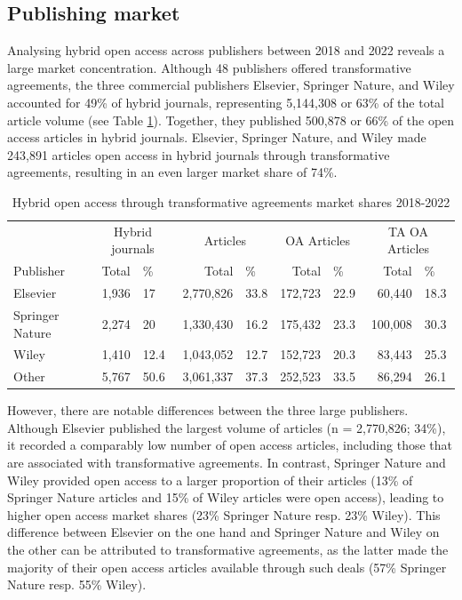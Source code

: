 \documentclass[a4paper,man,floatsintext,longtable,noextraspace,12pt]{apa6}
\begin{document}
\subsection{Publishing market}\label{publishing-market}

Analysing hybrid open access across publishers between 2018 and 2022
reveals a large market concentration. Although 48 publishers offered
transformative agreements, the three commercial publishers Elsevier,
Springer Nature, and Wiley accounted for 49\% of hybrid journals,
representing 5,144,308 or 63\% of the total article volume (see Table
\ref{tab:publisher_league_table}). Together, they published 500,878 or
66\% of the open access articles in hybrid journals. Elsevier, Springer
Nature, and Wiley made 243,891 articles open access in hybrid journals
through transformative agreements, resulting in an even larger market
share of 74\%.

\begin{table}[H]

\caption{\label{tab:publisher_league_table}Hybrid open access through transformative agreements market shares 2018-2022}
\centering
\begin{tabular}[t]{lrlrlrlrl}
\toprule
\multicolumn{1}{c}{ } & \multicolumn{2}{c}{Hybrid journals} & \multicolumn{2}{c}{Articles} & \multicolumn{2}{c}{OA Articles} & \multicolumn{2}{c}{TA OA Articles} \\
\cmidrule(l{3pt}r{3pt}){2-3} \cmidrule(l{3pt}r{3pt}){4-5} \cmidrule(l{3pt}r{3pt}){6-7} \cmidrule(l{3pt}r{3pt}){8-9}
Publisher & Total & \% & Total & \% & Total & \% & Total & \%\\
\midrule
Elsevier & 1,936 & 17 & 2,770,826 & 33.8 & 172,723 & 22.9 & 60,440 & 18.3\\
Springer Nature & 2,274 & 20 & 1,330,430 & 16.2 & 175,432 & 23.3 & 100,008 & 30.3\\
Wiley & 1,410 & 12.4 & 1,043,052 & 12.7 & 152,723 & 20.3 & 83,443 & 25.3\\
Other & 5,767 & 50.6 & 3,061,337 & 37.3 & 252,523 & 33.5 & 86,294 & 26.1\\
\bottomrule
\end{tabular}
\end{table}

However, there are notable differences between the three large
publishers. Although Elsevier published the largest volume of articles
(n = 2,770,826; 34\%), it recorded a comparably low number of open
access articles, including those that are associated with transformative
agreements. In contrast, Springer Nature and Wiley provided open access
to a larger proportion of their articles (13\% of Springer Nature
articles and 15\% of Wiley articles were open access), leading to higher
open access market shares (23\% Springer Nature resp. 23\% Wiley). This
difference between Elsevier on the one hand and Springer Nature and
Wiley on the other can be attributed to transformative agreements, as
the latter made the majority of their open access articles available
through such deals (57\% Springer Nature resp. 55\% Wiley).
\end{document}
